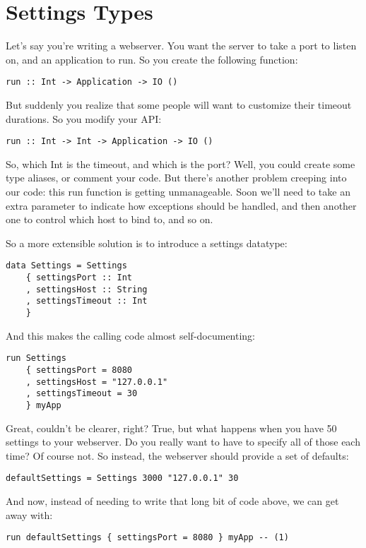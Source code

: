 \chapter{Settings Types}
Let's say you're writing a webserver. You want the server to take a port to listen on, and an
application to run. So you create the following function:
\begin{lstlisting}
run :: Int -> Application -> IO ()
\end{lstlisting}

But suddenly you realize that some people will want to customize their timeout durations. So
you modify your API:
\begin{lstlisting}
run :: Int -> Int -> Application -> IO ()
\end{lstlisting}

So, which Int is the timeout, and which is the port? Well, you could create
some type aliases, or comment your code. But there's another problem creeping into our code: this
run function is getting unmanageable. Soon we'll need to take an extra
parameter to indicate how exceptions should be handled, and then another one to control which
host to bind to, and so on.

So a more extensible solution is to introduce a settings datatype:
\begin{lstlisting}
data Settings = Settings
    { settingsPort :: Int
    , settingsHost :: String
    , settingsTimeout :: Int
    }
\end{lstlisting}
And this makes the calling code almost self-documenting:
\begin{lstlisting}
run Settings
    { settingsPort = 8080
    , settingsHost = "127.0.0.1"
    , settingsTimeout = 30
    } myApp
\end{lstlisting}

Great, couldn't be clearer, right? True, but what happens when you have 50 settings to your
webserver. Do you really want to have to specify all of those each time? Of course not. So
instead, the webserver should provide a set of defaults:
\begin{lstlisting}
defaultSettings = Settings 3000 "127.0.0.1" 30
\end{lstlisting}
And now, instead of needing to write that long bit of code above, we can get away with:
\begin{lstlisting}
run defaultSettings { settingsPort = 8080 } myApp -- (1)
\end{lstlisting}

